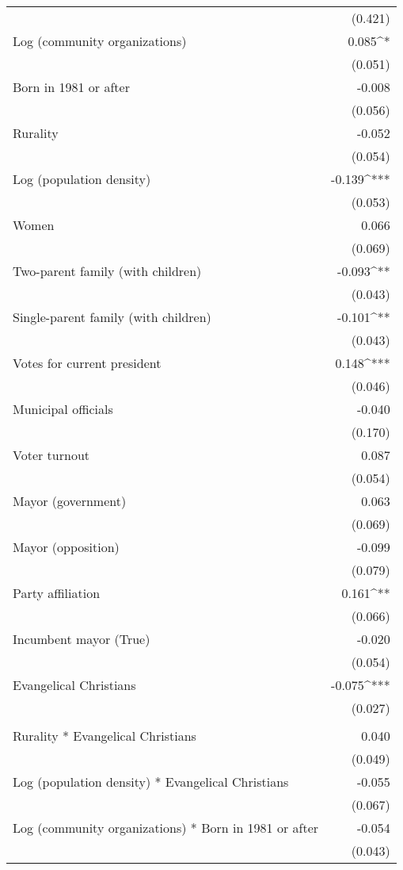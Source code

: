 \documentclass[onecolumn]{article}
\begin{document}
\begin{table}[!htbp]
\begin{tabular}{@{\extracolsep{5pt}}lD{.}{.}{-3} }
  & (0.421) \\ 
  Log (community organizations) & 0.085^{*} \\ 
  & (0.051) \\ 
  Born in 1981 or after & -0.008 \\ 
  & (0.056) \\ 
  Rurality & -0.052 \\ 
  & (0.054) \\ 
  Log (population density) & -0.139^{***} \\ 
  & (0.053) \\ 
  Women & 0.066 \\ 
  & (0.069) \\ 
  Two-parent family (with children) & -0.093^{**} \\ 
  & (0.043) \\ 
  Single-parent family (with children) & -0.101^{**} \\ 
  & (0.043) \\ 
  Votes for current president & 0.148^{***} \\ 
  & (0.046) \\ 
  Municipal officials & -0.040 \\ 
  & (0.170) \\ 
  Voter turnout & 0.087 \\ 
  & (0.054) \\ 
  Mayor (government) & 0.063 \\ 
  & (0.069) \\ 
  Mayor (opposition) & -0.099 \\ 
  & (0.079) \\ 
  Party affiliation & 0.161^{**} \\ 
  & (0.066) \\ 
  Incumbent mayor (True) & -0.020 \\ 
  & (0.054) \\ 
  Evangelical Christians & -0.075^{***} \\ 
  & (0.027) \\ 
  \hline\\[-1.8ex]
  Rurality * Evangelical Christians & 0.040 \\ 
  & (0.049) \\ 
  Log (population density) * Evangelical Christians & -0.055 \\ 
  & (0.067) \\ 
  Log (community organizations) * Born in 1981 or after & -0.054 \\ 
  & (0.043) \\ 

\end{tabular}
\end{table}
\end{document}
